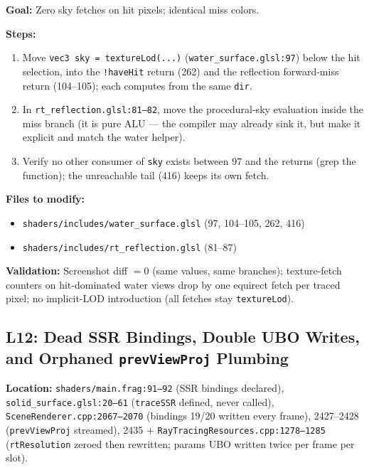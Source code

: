 \documentclass[11pt,a4paper]{article}
\begin{document}
\begin{tcolorbox}[promptbox={Prompt: Make the Sky Fetch Miss-Only in rtTraceWater}]
\textbf{Goal:} Zero sky fetches on hit pixels; identical miss colors.

\textbf{Steps:}
\begin{enumerate}
    \item Move \texttt{vec3 sky = textureLod(...)} (\texttt{water\_surface.glsl:97}) below the hit selection, into the \texttt{!haveHit} return (262) and the reflection forward-miss return (104--105); each computes from the same \texttt{dir}.
    \item In \texttt{rt\_reflection.glsl:81--82}, move the procedural-sky evaluation inside the miss branch (it is pure ALU --- the compiler may already sink it, but make it explicit and match the water helper).
    \item Verify no other consumer of \texttt{sky} exists between 97 and the returns (grep the function); the unreachable tail (416) keeps its own fetch.
\end{enumerate}

\textbf{Files to modify:}
\begin{itemize}
    \item \texttt{shaders/includes/water\_surface.glsl} (97, 104--105, 262, 416)
    \item \texttt{shaders/includes/rt\_reflection.glsl} (81--87)
\end{itemize}

\textbf{Validation:} Screenshot diff $=0$ (same values, same branches); texture-fetch counters on hit-dominated water views drop by one equirect fetch per traced pixel; no implicit-LOD introduction (all fetches stay \texttt{textureLod}).
\end{tcolorbox}

\subsection{L12: Dead SSR Bindings, Double UBO Writes, and Orphaned \texttt{prevViewProj} Plumbing}

\textbf{Location:} \texttt{shaders/main.frag:91--92} (SSR bindings declared), \texttt{solid\_surface.glsl:20--61} (\texttt{traceSSR} defined, never called), \texttt{SceneRenderer.cpp:2067--2070} (bindings 19/20 written every frame), 2427--2428 (\texttt{prevViewProj} streamed), 2435 $+$ \texttt{RayTracingResources.cpp:1278--1285} (\texttt{rtResolution} zeroed then rewritten; params UBO written twice per frame per slot).
\end{document}
